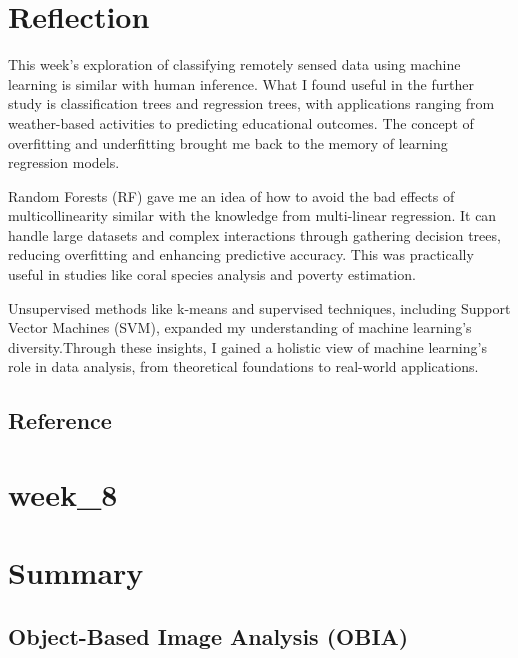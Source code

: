 \documentclass[
  letterpaper,
  DIV=11,
  numbers=noendperiod]{scrreprt}
\begin{document}

\chapter{Reflection}\label{reflection-3}

This week's exploration of classifying remotely sensed data using
machine learning is similar with human inference. What I found useful in
the further study is classification trees and regression trees, with
applications ranging from weather-based activities to predicting
educational outcomes. The concept of overfitting and underfitting
brought me back to the memory of learning regression models.

Random Forests (RF) gave me an idea of how to avoid the bad effects of
multicollinearity similar with the knowledge from multi-linear
regression. It can handle large datasets and complex interactions
through gathering decision trees, reducing overfitting and enhancing
predictive accuracy. This was practically useful in studies like coral
species analysis and poverty estimation.

Unsupervised methods like k-means and supervised techniques, including
Support Vector Machines (SVM), expanded my understanding of machine
learning's diversity.Through these insights, I gained a holistic view of
machine learning's role in data analysis, from theoretical foundations
to real-world applications.

\section{\texorpdfstring{\textbf{Reference}}{Reference}}\label{reference}


\chapter{week\_8}\label{week_8}


\chapter{Summary}\label{summary-2}

\section{Object-Based Image Analysis
(OBIA)}\label{object-based-image-analysis-obia}
\end{document}

